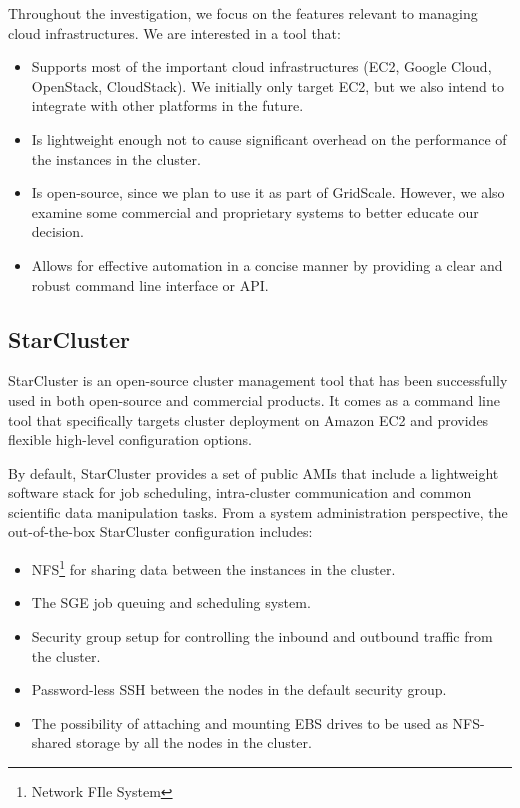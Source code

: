Throughout the investigation, we focus on the features relevant to managing cloud infrastructures. We are interested in a tool that:
\begin{itemize}
	\item Supports most of the important cloud infrastructures (EC2, Google Cloud, OpenStack, CloudStack). We initially only target EC2, but we also intend to integrate with other platforms in the future.
	\item Is lightweight enough not to cause significant overhead on the performance of the instances in the cluster.
	\item Is open-source, since we plan to use it as part of GridScale. However, we also examine some commercial and proprietary systems to better educate our decision.
	\item Allows for effective automation in a concise manner by providing a clear and robust command line interface or API.
\end{itemize}

\subsection{StarCluster}

StarCluster \cite{StarCluster} is an open-source cluster management tool that has been successfully used in both open-source and commercial products. It comes as a command line tool that specifically targets cluster deployment on Amazon EC2 and provides flexible high-level configuration options.

By default, StarCluster provides a set of public AMIs that include a lightweight software stack for job scheduling, intra-cluster communication and common scientific data manipulation tasks. From a system administration perspective, the out-of-the-box StarCluster configuration includes:
\begin{itemize}
	\item NFS\footnote{Network FIle System} \cite{NFS} for sharing data between the instances in the cluster.
	\item The SGE job queuing and scheduling system.
	\item Security group setup for controlling the inbound and outbound traffic from the cluster.
	\item Password-less SSH between the nodes in the default security group.
	\item The possibility of attaching and mounting EBS drives to be used as NFS-shared storage by all the nodes in the cluster.
\end{itemize}

